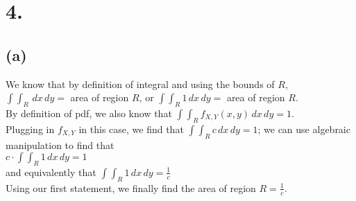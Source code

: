 \documentclass{article}
\begin{document}
\section*{4.}
{\Large 

\subsection*{(a)}
We know that by definition of integral and using the bounds of $R$, \\
$\int \int_{R} \,dx \,dy = $ area of region $R$, or $\int \int_{R} 1 \,dx \,dy = $ area of region $R$. \\ 
By definition of pdf, we also know that $\int \int_{R} f_{X, Y} (x, y) \,dx \,dy = 1$. \\
Plugging in $f_{X, Y}$ in this case, we find that $\int \int_{R} c \,dx \,dy = 1$; we can use algebraic manipulation to find that \\ 
$c \cdot \int \int_{R} 1 \,dx \,dy = 1$ \\ 
and equivalently that $\int \int_{R} 1 \,dx \,dy = \frac{1}{c}$ \\
Using our first statement, we finally find the area of region $R = \frac{1}{c}$.

}
\end{document}
